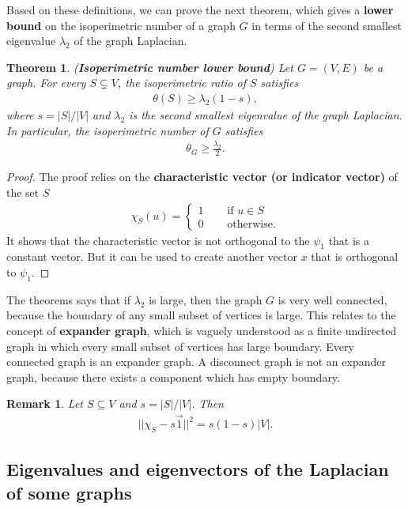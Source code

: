 \documentclass[]{article}
\newtheorem{theorem}{Theorem}[section]
\newtheorem{remark}{Remark}[section]
\begin{document}
	Based on these definitions, we can prove the next theorem, which gives a \textbf{lower bound} on the isoperimetric number of a graph $G$ in terms of the second smallest eigenvalue $\lambda_2$ of the graph Laplacian. 
	\begin{theorem} (\textbf{Isoperimetric number lower bound})
		Let $G=(V,E)$ be a graph. For every $S \subsetneq V$, the isoperimetric ratio of $S$ satisfies 
		\begin{align*}
		\theta(S) \ge \lambda_2(1-s),
		\end{align*}
		where $s=|S|/|V|$ and $\lambda_2$ is the second smallest eigenvalue of the graph Laplacian. In particular, the isoperimetric number of $G$ satisfies 
		\begin{align*}
		\theta_G \ge \frac{\lambda_2}{2}.
		\end{align*}
	\end{theorem}
	\begin{proof}
		The proof relies on the \textbf{characteristic vector (or indicator vector)} of the set $S$ 
		\begin{align*}
		\chi_S(u) = 
		\begin{cases}
		1 & \quad \text{ if } u \in S\\
		0 & \quad \text{ otherwise.}
		\end{cases}
		\end{align*}
		It shows that the characteristic vector is not orthogonal to the $\psi_1$ that is a constant vector. But it can be used to create another vector $x$ that is orthogonal to $\psi_1$. 
	\end{proof}
	The theorems says that if $\lambda_2$ is large, then the graph $G$ is very well connected, because the boundary of any small subset of vertices is large. This relates to the concept of \textbf{expander graph}, which is vaguely understood as a finite undirected graph in which every small subset of vertices has large boundary. Every connected graph is an expander graph. A disconnect graph is not an expander graph, because there exists a component which has empty boundary. 
	
	\begin{remark}
		Let $S \subseteq V$ and $s = |S|/|V|$. Then 
		\begin{align*}
		||\chi_S - s \vec{1}||^2 = s(1-s)|V|.
		\end{align*}
	\end{remark}
	
	\subsection{Eigenvalues and eigenvectors of the Laplacian of some graphs}
	
\end{document}
